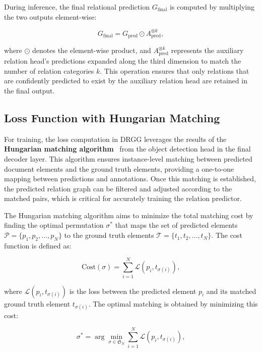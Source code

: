 During inference, the final relational prediction $ G_{\text{final}} $ is computed by multiplying the two outputs element-wise:

\begin{equation}
G_{\text{final}} = G_{\text{pred}} \odot A_{\text{pred}}^{\otimes k},
\end{equation}

where $ \odot $ denotes the element-wise product, and $ A_{\text{pred}}^{\otimes k} $ represents the auxiliary relation head’s predictions expanded along the third dimension to match the number of relation categories $ k $. This operation ensures that only relations that are confidently predicted to exist by the auxiliary relation head are retained in the final output.

\subsection{Loss Function with Hungarian Matching}

For training, the loss computation in DRGG leverages the results of the \textbf{Hungarian matching algorithm}~\citep{HungarianAssignment} from the object detection head in the final decoder layer. This algorithm ensures instance-level matching between predicted document elements and the ground truth elements, providing a one-to-one mapping between predictions and annotations. Once this matching is established, the predicted relation graph can be filtered and adjusted according to the matched pairs, which is critical for accurately training the relation predictor.

The Hungarian matching algorithm aims to minimize the total matching cost by finding the optimal permutation \( \sigma^* \) that maps the set of predicted elements \( \mathcal{P} = \{p_1, p_2, \dots, p_N\} \) to the ground truth elements \( \mathcal{T} = \{t_1, t_2, \dots, t_N\} \). The cost function is defined as:

\begin{equation}
\text{Cost}(\sigma) = \sum_{i=1}^{N} \mathcal{L}(p_i, t_{\sigma(i)}),
\end{equation}

where \( \mathcal{L}(p_i, t_{\sigma(i)}) \) is the loss between the predicted element \( p_i \) and its matched ground truth element \( t_{\sigma(i)} \). The optimal matching is obtained by minimizing this cost:

\begin{equation}
\sigma^* = \arg\min_{\sigma \in \mathfrak{S}_N} \sum_{i=1}^{N} \mathcal{L}(p_i, t_{\sigma(i)}),
\end{equation}

